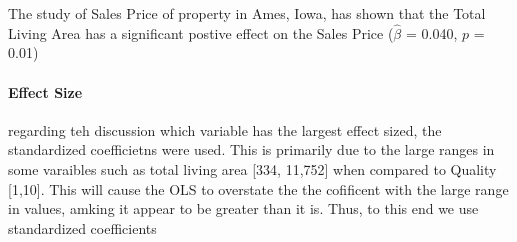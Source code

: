 \documentclass{article}
\begin{document}
The study of Sales Price of property in Ames, Iowa, has shown that the Total Living Area has a significant postive effect on the Sales Price ($\hat{\beta}$ = 0.040, $p$ = 0.01)

\paragraph{Effect Size} regarding teh discussion which variable has the largest effect sized, the standardized coefficietns were used. This is primarily due to the large ranges in some varaibles such as total living area [334, 11,752] when compared to Quality [1,10]. This will cause the OLS to overstate the the cofificent with the large range in values, amking it appear to be greater than it is. Thus, to this end we use standardized coefficients
\end{document}
